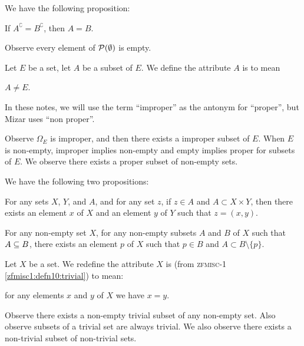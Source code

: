 \documentclass{article}
\begin{document}
We have the following proposition:
\begin{thm}
\item\label{subset1:42} If $A^{\complement}=B^{\complement}$, then $A=B$.
\end{thm}

Observe every element of $\mathcal{P}(\emptyset)$ is empty.

\begin{definition}
Let $E$ be a set, let $A$ be a subset of $E$. We define the attribute
$A$ is  to mean
\begin{defn}
\item $A\neq E$.
\end{defn}
In these notes, we will use the term ``improper'' as the antonym for
``proper'', but Mizar uses ``non proper''.
\end{definition}

Observe $\Omega_{E}$ is improper, and then there exists a improper
subset of $E$. When $E$ is non-empty, improper implies non-empty and
empty implies proper for subsets of $E$. We observe there exists a
proper subset of non-empty sets.

We have the following two propositions:
\begin{thm}
\item\label{subset1:43} For any sets $X$, $Y$, and $A$, and for any set $z$,
if $z\in A$ and $A\subset X\times Y$, then there exists an element $x$
of $X$ and an element $y$ of $Y$ such that $z=(x,y)$.
\item\label{subset1:44} For any non-empty set $X$, for any non-empty
  subsets $A$ and $B$ of $X$ such that $A\properSubset B$, there exists
  an element $p$ of $X$ such that $p\in B$ and $A\subset B\setminus\{p\}$.
\end{thm}

\begin{definition}
Let $X$ be a set. We redefine the attribute $X$ is 
(from \textsc{zfmisc-1} \eqref{zfmisc1:defn10:trivial}) to mean:
\begin{defn}
\item for any elements $x$ and $y$ of $X$ we have $x=y$.
\end{defn}
\end{definition}


Observe there exists a non-empty trivial subset of any non-empty set.
Also observe subsets of a trivial set are always trivial. We also
observe there exists a non-trivial subset of non-trivial sets.
\end{document}
